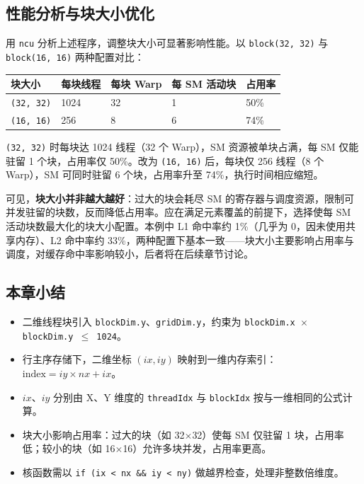 \subsection{性能分析与块大小优化}

用 \texttt{ncu} 分析上述程序，调整块大小可显著影响性能。以 \texttt{block(32, 32)} 与 \texttt{block(16, 16)} 两种配置对比：

\begin{center}
\begin{tabular}{|p{2.5cm}|p{2.2cm}|p{2.2cm}|p{2.8cm}|p{2cm}|}
\hline
\textbf{块大小} & \textbf{每块线程} & \textbf{每块 Warp} & \textbf{每 SM 活动块} & \textbf{占用率} \\
\hline
\texttt{(32, 32)} & 1024 & 32 & 1 & 50\% \\
\hline
\texttt{(16, 16)} & 256 & 8 & 6 & 74\% \\
\hline
\end{tabular}
\end{center}

\texttt{(32, 32)} 时每块达 1024 线程（32 个 Warp），SM 资源被单块占满，每 SM 仅能驻留 1 个块，占用率仅 50\%。改为 \texttt{(16, 16)} 后，每块仅 256 线程（8 个 Warp），SM 可同时驻留 6 个块，占用率升至 74\%，执行时间相应缩短。

可见，\textbf{块大小并非越大越好}：过大的块会耗尽 SM 的寄存器与调度资源，限制可并发驻留的块数，反而降低占用率。应在满足元素覆盖的前提下，选择使每 SM 活动块数最大化的块大小配置。本例中 L1 命中率约 1\%（几乎为 0，因未使用共享内存）、L2 命中率约 33\%，两种配置下基本一致——块大小主要影响占用率与调度，对缓存命中率影响较小，后者将在后续章节讨论。

\subsection{本章小结}

\begin{itemize}
    \item 二维线程块引入 \texttt{blockDim.y}、\texttt{gridDim.y}，约束为 \texttt{blockDim.x $\times$ blockDim.y $\leq$ 1024}。
    \item 行主序存储下，二维坐标 $(ix, iy)$ 映射到一维内存索引：$\text{index} = iy \times nx + ix$。
    \item $ix$、$iy$ 分别由 X、Y 维度的 \texttt{threadIdx} 与 \texttt{blockIdx} 按与一维相同的公式计算。
    \item 块大小影响占用率：过大的块（如 32$\times$32）使每 SM 仅驻留 1 块，占用率低；较小的块（如 16$\times$16）允许多块并发，占用率更高。
    \item 核函数需以 \texttt{if (ix < nx \&\& iy < ny)} 做越界检查，处理非整数倍维度。
\end{itemize}
